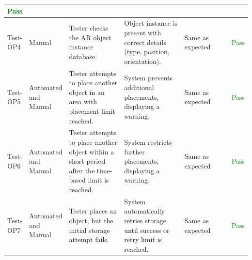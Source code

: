 \documentclass[12pt, titlepage]{article}
\begin{document}
\begin{table}[H]
{\begin{tabular}{|l|p{0.15\linewidth}|p{0.3\linewidth}|p{0.3\linewidth}|p{0.3\linewidth}|p{0.1\linewidth}|}
      \textcolor{Green}{Pass}                                                                                \\
      \hline
      Test-OP4                                                                                             &
      Manual                                                                                               &
      Tester checks the AR object instance database.                                                       &
      Object instance is present with correct details (type, position, orientation).                       &
      Same as expected                                                                                     &
      \textcolor{Green}{Pass}                                                                                \\
      \hline
      Test-OP5                                                                                             &
      Automated and Manual                                                                                 &
      Tester attempts to place another object in an area with placement limit reached.                     &
      System prevents additional placements, displaying a warning.                                         &
      Same as expected                                                                                     &
      \textcolor{Green}{Pass}                                                                                \\
      \hline
      Test-OP6                                                                                             &
      Automated and Manual                                                                                 &
      Tester attempts to place another object within a short period after the time-based limit is reached. &
      System restricts further placements, displaying a warning.                                           &
      Same as expected                                                                                     &
      \textcolor{Green}{Pass}                                                                                \\
      \hline
      Test-OP7                                                                                             &
      Automated and Manual                                                                                 &
      Tester places an object, but the initial storage attempt fails.                                      &
      System automatically retries storage until success or retry limit is reached.                        &
      Same as expected                                                                                     &
      \textcolor{Green}{Pass}                                                                                \\
      \hline
    \end{tabular}}
  \label{table:Object_Placement_Tests}
\end{table}
\end{document}
